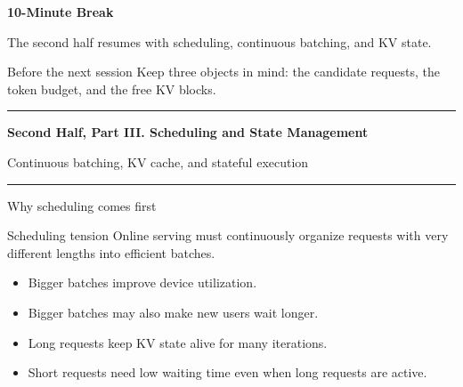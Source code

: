\documentclass[aspectratio=169,11pt]{beamer}
\newcommand{\topicsectionpage}[2]{%
  \begin{frame}[plain]
    \vspace{1.0cm}
    {\huge\bfseries\textcolor{HUSTBlue}{#1}}\par
    \vspace{0.26cm}
    {\large\textcolor{HUSTGray}{#2}}\par
    \vfill
    \textcolor{HUSTLine}{\rule{0.76\paperwidth}{0.8pt}}
  \end{frame}
}
\newcommand{\breakpage}[2]{%
  \begin{frame}[plain]
    \vspace{1.0cm}
    {\huge\bfseries\textcolor{HUSTBlue}{10-Minute Break}}\par
    \vspace{0.28cm}
    {\Large\textcolor{HUSTGray}{#1}}\par
    \vspace{0.8cm}
    \begin{block}{Before the next session}
      #2
    \end{block}
    \vfill
    \textcolor{HUSTLine}{\rule{0.76\paperwidth}{0.8pt}}
  \end{frame}
}
\begin{document}
\breakpage
  {The second half resumes with scheduling, continuous batching, and KV state.}
  {Keep three objects in mind: the candidate requests, the token budget, and the free KV blocks.}

\topicsectionpage{Second Half, Part III. Scheduling and State Management}{Continuous batching, KV cache, and stateful execution}

\begin{frame}{Why scheduling comes first}
  \begin{block}{Scheduling tension}
    Online serving must continuously organize requests with very different lengths into efficient batches.
  \end{block}
  \begin{itemize}
    \item Bigger batches improve device utilization.
    \item Bigger batches may also make new users wait longer.
    \item Long requests keep KV state alive for many iterations.
    \item Short requests need low waiting time even when long requests are active.
  \end{itemize}
\end{frame}

\end{document}
